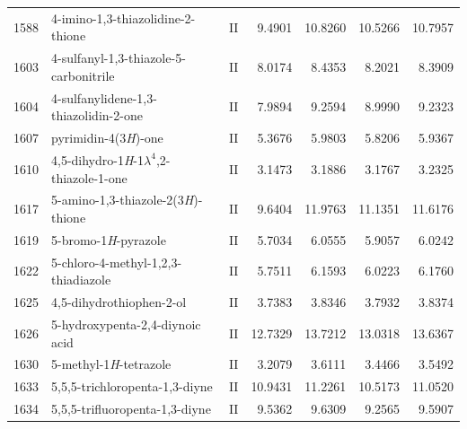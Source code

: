 \begin{longtable}{rlld{2.5}d{2.5}d{2.5}d{2.5}}
    1588 & 4-imino-1,3-thiazolidine-2-thione                      & II & 9.4901  & 10.8260 & 10.5266 & 10.7957 \\
    1603 & 4-sulfanyl-1,3-thiazole-5-carbonitrile                 & II & 8.0174  & 8.4353  & 8.2021  & 8.3909  \\
    1604 & 4-sulfanylidene-1,3-thiazolidin-2-one                  & II & 7.9894  & 9.2594  & 8.9990  & 9.2323  \\
    1607 & pyrimidin-4(3\textit{H})-one                           & II & 5.3676  & 5.9803  & 5.8206  & 5.9367  \\
    1610 & 4,5-dihydro-1\textit{H}-1$\lambda^4$,2-thiazole-1-one  & II & 3.1473  & 3.1886  & 3.1767  & 3.2325  \\
    1617 & 5-amino-1,3-thiazole-2(3\textit{H})-thione             & II & 9.6404  & 11.9763 & 11.1351 & 11.6176 \\
    1619 & 5-bromo-1\textit{H}-pyrazole                           & II & 5.7034  & 6.0555  & 5.9057  & 6.0242  \\
    1622 & 5-chloro-4-methyl-1,2,3-thiadiazole                    & II & 5.7511  & 6.1593  & 6.0223  & 6.1760  \\
    1625 & 4,5-dihydrothiophen-2-ol                               & II & 3.7383  & 3.8346  & 3.7932  & 3.8374  \\
    1626 & 5-hydroxypenta-2,4-diynoic   acid                      & II & 12.7329 & 13.7212 & 13.0318 & 13.6367 \\
    1630 & 5-methyl-1\textit{H}-tetrazole                         & II & 3.2079  & 3.6111  & 3.4466  & 3.5492  \\
    1633 & 5,5,5-trichloropenta-1,3-diyne                         & II & 10.9431 & 11.2261 & 10.5173 & 11.0520 \\
    1634 & 5,5,5-trifluoropenta-1,3-diyne                         & II & 9.5362  & 9.6309  & 9.2565  & 9.5907 
\end{longtable}